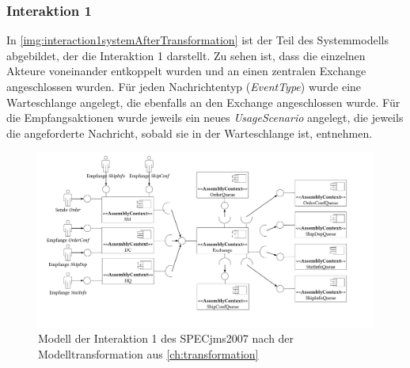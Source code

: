 \subsubsection{Interaktion 1}
In \autoref{img:interaction1systemAfterTransformation} ist der Teil des Systemmodells abgebildet, der die Interaktion 1 darstellt. Zu sehen ist, dass die einzelnen Akteure voneinander entkoppelt wurden und an einen zentralen Exchange angeschlossen wurden. Für jeden Nachrichtentyp (\emph{EventType}) wurde eine Warteschlange angelegt, die ebenfalls an den Exchange angeschlossen wurde. Für die Empfangsaktionen wurde jeweils ein neues \emph{UsageScenario} angelegt, die jeweils die angeforderte Nachricht, sobald sie in der Warteschlange ist, entnehmen. 
\begin{figure}
\center
  \includegraphics[width=1.4\textwidth,angle=90]{images/evaluation/specjms/evaluationInteraktion1new.pdf}
  \caption{Modell der Interaktion 1 des SPECjms2007 nach der Modelltransformation aus \autoref{ch:transformation}}
  \label{img:interaction1systemAfterTransformation}
\end{figure}
